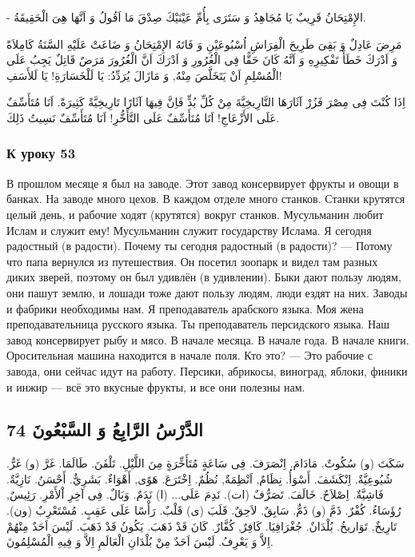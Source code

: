 \documentclass[a5paper]{article}
\begin{document}
- الإِمْتِحَانُ قَرِيبٌ يَا مُجَاهِدُ وَ سَتَرَى بِأُمِّ عَيْنَيْكَ صِدْقَ مَا اَقُولُ وَ اَنَّهَا هِىَ الْحَقِيقَةُ.

مَرِضَ عَادِلٌ وَ بَقِىَ طَرِيحَ الْفِرَاشِ اُسْبُوعَيْنِ وَ فَاتَهُ الإِمْتِحَانُ وَ ضَاعَتْ عَلَيْهِ السَّنَةُ كَامِلاَةً وَ اَدْرَكَ خَطَأَ تَفْكِيرِهِ وَ اَنَّهُ كَانَ حَقًّا فِى الْغُرُورِ وَ اَدْرَكَ اَنَّ الْغُرُورَ مَرَضٌ قَاتِلٌ يَجِبُ عَلَى الْمُسْلِمِ اَنْ يَتَخَلَّصَ مِنْهُ, وَ مَازَالَ يُرَدِّدُ: يَا لَلْخَسَارَةِ! يَا لَلأَسَفِ! 

اِذَا كُنْتَ فِى مِصْرَ فَزُرْ آثَارَهَا التَّارِيخِيَّةَ مِنْ كُلِّ بُدٍّ فَاِنَّ فِيهَا آثَارًا تَارِيخِيَّةً كَثِيرَةً. اَنَا مُتَأَسِّفٌ عَلَى الأَزْعَاجِ! اَنَا مُتَأَسِّفٌ عَلَى التَّأَخُّرِ! اَنَا مُتَأَسِّفٌ نَسِيتُ ذَلِكَ.

\subsubsection{К уроку 53}
В прошлом месяце я был на заводе. Этот завод консервирует фрукты и овощи в банках. На заводе много цехов. В каждом отделе много станков. Станки крутятся целый день, и рабочие ходят (крутятся) вокруг станков. Мусульманин любит Ислам и служит ему! Мусульманин служит государству Ислама. Я сегодня радостный (в радости). Почему ты сегодня радостный (в радости)? — Потому что папа вернулся из путешествия. Он посетил зоопарк и видел там разных диких зверей, поэтому он был удивлён (в удивлении). Быки дают пользу людям, они пашут землю, и лошади тоже дают пользу людям, люди ездят на них. Заводы и фабрики необходимы нам. Я преподаватель арабского языка. Моя жена преподавательница русского языка. Ты преподаватель персидского языка. Наш завод консервирует рыбу и мясо. В начале месяца. В начале года. В начале книги. Оросительная машина находится в начале поля. Кто это? — Это рабочие с завода, они сейчас идут на работу. Персики, абрикосы, виноград, яблоки, финики и инжир — всё это вкусные фрукты, и все они полезны нам.

\subsection[الدَّرْسُ الرَّابِعُ وَ السَّبْعُونَ 74]{الدَّرْسُ الرَّابِعُ وَ السَّبْعُونَ 74}
سَكَتَ (و) سُكُوتٌ. مَادَامَ. اِنْصَرَفَ. فِى سَاعَةٍ مُتَأَخِّرَةٍ مِنَ اللَّيْلِ. تَلْفَنَ. طَالَمَا. غَرَّ (و) غَرٌّ. شُيُوعِيَّةٌ. اِنْكَشَفَ. أَسْوَأُ. نِظَامٌ, اَنْظِمَةٌ, نُظُمٌ. اِخْتَرَعَ. هَوًى, أَهْوَاءٌ. بَشَرِيٌّ. أَحْسَنُ. نَازِيَّةٌ. فَاشِيَّةٌ. اِصْلاَحٌ. خَالَفَ. تَصَرُّفٌ (ات). نَدِمَ عَلَى... (ا) نَدَمٌ. وَبَالٌ. فِى آخِرِ اْلأَمْرِ. رَئِيسٌ, رُؤَسَاءُ. كُفْرٌ. ذَمَّ (و) ذَمٌّ. سَابِقٌ. لاَحِقٌ. قَلَبَ (ى) قَلْبٌ. رَأْسًا عَلَى عَقِبٍ. مُسْتَعْرِبٌ (ون). تَارِيخٌ, تَوَاريخُ. بُلْدَانٌ. جُغْرَافِيَا. كَافِرٌ, كُفَّارٌ. كَانَ قَدْ ذَهَبَ. يَكُونُ قَدْ ذَهَبَ. لَيْسَ اَحَدٌ مِنْهُمْ اِلاَّ وَ يَعْرِفُ. لَيْسَ اَحَدٌ مِنْ بُلْدَانِ الْعَالَمِ اِلاَّ وَ فِيهِ الْمُسْلِمُونَ. 
\end{document}
